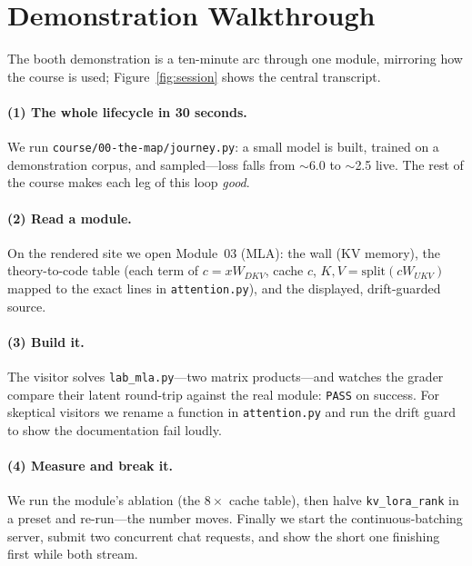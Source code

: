 \section{Demonstration Walkthrough}
\label{app:demo}

The booth demonstration is a ten-minute arc through one module, mirroring how
the course is used; Figure~\ref{fig:session} shows the central transcript.

\paragraph{(1) The whole lifecycle in 30 seconds.} We run
\texttt{course/00-the-map/journey.py}: a small model is built, trained on a
demonstration corpus, and sampled---loss falls from $\sim$6.0 to $\sim$2.5
live. The rest of the course makes each leg of this loop \emph{good}.

\paragraph{(2) Read a module.} On the rendered site we open Module~03 (MLA):
the wall (KV memory), the theory-to-code table (each term of $c = xW_{DKV}$,
cache $c$, $K,V=\mathrm{split}(cW_{UKV})$ mapped to the exact lines in
\texttt{attention.py}), and the displayed, drift-guarded source.

\paragraph{(3) Build it.} The visitor solves \texttt{lab\_mla.py}---two
matrix products---and watches the grader compare their latent round-trip
against the real module: \texttt{PASS} on success. For skeptical visitors
we rename a function in
\texttt{attention.py} and run the drift guard to show the documentation fail
loudly.

\paragraph{(4) Measure and break it.} We run the module's ablation (the
$8\times$ cache table), then halve \texttt{kv\_lora\_rank} in a preset and
re-run---the number moves. Finally we start the
continuous-batching server, submit two concurrent chat requests, and show the
short one finishing first while both stream.

